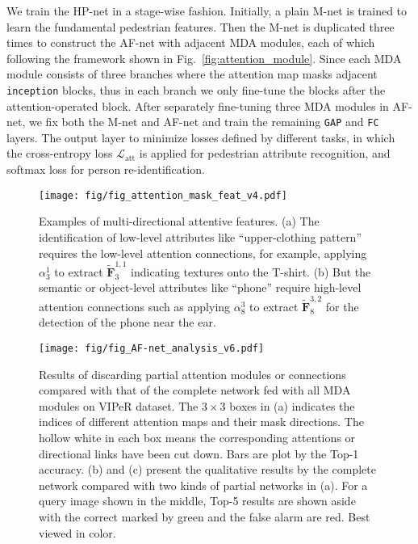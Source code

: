 \documentclass[10pt,twocolumn,letterpaper]{article}
\begin{document}
We train the HP-net in a stage-wise fashion.
Initially, a plain M-net is trained to learn the fundamental pedestrian features.
Then the M-net is duplicated three times to construct the AF-net with adjacent MDA modules, each of which following the framework shown in Fig.~\ref{fig:attention_module}.
Since each MDA module consists of three branches where the attention map masks adjacent \texttt{inception} blocks, thus in each branch we only fine-tune the blocks after the attention-operated block.
After separately fine-tuning three MDA modules in AF-net, we fix both the M-net and AF-net and train the remaining \texttt{GAP} and \texttt{FC} layers.
The output layer to minimize losses defined by different tasks, in which the cross-entropy loss $\mathcal{L}_\text{att}$ is applied for pedestrian attribute recognition, and softmax loss for person re-identification.






\begin{figure}[t]
\centering
\texttt{[image: fig/fig\_attention\_mask\_feat\_v4.pdf]}
\caption{
Examples of multi-directional attentive features.
(a) The identification of low-level attributes like ``upper-clothing pattern'' requires the low-level attention connections, for example, applying $\alpha^1_3$ to extract $\tilde{\mathbf{F}}^{1,1}_3$ indicating textures onto the T-shirt. (b) But the semantic or object-level attributes like ``phone'' require high-level attention connections such as applying $\alpha^3_8$ to extract $\tilde{\mathbf{F}}^{3,2}_8$ for the detection of the phone near the ear.
}
\label{fig:attention_mask_feat}
\end{figure}



\begin{figure*}[t]
\centering
\texttt{[image: fig/fig\_AF-net\_analysis\_v6.pdf]}
\caption{Results of discarding partial attention modules or connections compared with that of the complete network fed with all MDA modules on VIPeR dataset. The $3\times 3$ boxes in (a) indicates the indices of different attention maps and their mask directions. The hollow white in each box means the corresponding attentions or directional links have been cut down. Bars are plot by the Top-1 accuracy. (b) and (c) present the qualitative results by the complete network compared with two kinds of partial networks in (a). For a query image shown in the middle, Top-5 results are shown aside with the correct marked by green and the false alarm are red. Best viewed in color.
}
\label{fig:AF-net_analysis}
\end{figure*}
\end{document}
